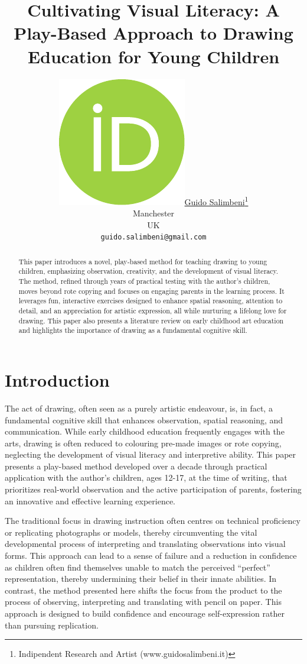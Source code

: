 \documentclass{article}
\title{Cultivating Visual Literacy: A Play-Based Approach to Drawing Education for Young Children}
\author{ \href{https://orcid.org/0000-0001-6666-3518}{\includegraphics[scale=0.06]{orcid.pdf}\hspace{1mm}Guido Salimbeni}\thanks{Indipendent Research and Artist (www.guidosalimbeni.it)} \\
	Manchester\\
	UK \\
	\texttt{guido.salimbeni@gmail.com} \\
}
\begin{document}
\maketitle

\begin{abstract}
	This paper introduces a novel, play-based method for teaching drawing to young children, emphasizing observation, creativity, and the development of visual literacy. The method, refined through years of practical testing with the author’s children, moves beyond rote copying and focuses on engaging parents in the learning process. It leverages fun, interactive exercises designed to enhance spatial reasoning, attention to detail, and an appreciation for artistic expression, all while nurturing a lifelong love for drawing. This paper also presents a literature review on early childhood art education and highlights the importance of drawing as a fundamental cognitive skill.
\end{abstract}




\section{Introduction}
The act of drawing, often seen as a purely artistic endeavour, is, in fact, a fundamental cognitive skill that enhances observation, spatial reasoning, and communication. While early childhood education frequently engages with the arts, drawing is often reduced to colouring pre-made images or rote copying, neglecting the development of visual literacy and interpretive ability. This paper presents a play-based method developed over a decade through practical application with the author’s children, ages 12-17, at the time of writing, that prioritizes real-world observation and the active participation of parents, fostering an innovative and effective learning experience.

The traditional focus in drawing instruction often centres on technical proficiency or replicating photographs or models, thereby circumventing the vital developmental process of interpreting and translating observations into visual forms. This approach can lead to a sense of failure and a reduction in confidence as children often find themselves unable to match the perceived “perfect” representation, thereby undermining their belief in their innate abilities. In contrast, the method presented here shifts the focus from the product to the process of observing, interpreting and translating with pencil on paper. This approach is designed to build confidence and encourage self-expression rather than pursuing replication.
\end{document}
